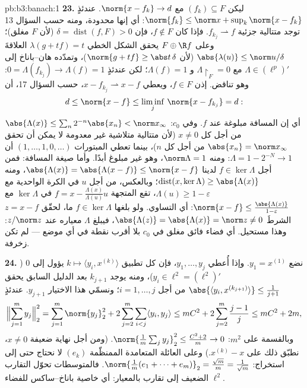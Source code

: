 \begin{solution}{pb:b3:banach:1}
\textbf{23.} ليكن $(f_k) \subseteq F$ مع $\norm{x - f_k}
\to d$. عندئذٍ $\norm{f_k} \leq \norm x + \sup_k\norm{x -
f_k}$: أي إنها
محدودة، ومنه حسب السؤال 13 توجد متتالية جزئية $f_{k_j}
\rightharpoonup f$. فإذا
كان $f \notin F$، فإن $\delta =
\operatorname{dist}(f, F) > 0$ (لأن $F$ مغلق)؛ وعلى $F \oplus \R
f$
يحقق الشكل الخطي $\lambda(g + tf) = t$ العلاقةَ $\abs{\lambda(u)} \leq \norm u/\delta$ (لأن $\norm{g +
tf} \geq \abs t\,\delta$)،
وتمدّده هان--باناخ إلى $\Lambda \in (\ell^p)'$ مع $\Lambda\restriction_F = 0$ و $\Lambda(f) = 1$؛
لكن عندئذٍ $0 = \Lambda(f_{k_j}) \to
\Lambda(f) = 1$: وهو تناقض. إذن $f \in F$، ويعطي $x -
f_{k_j} \rightharpoonup x - f$،
حسب السؤال 17، أن
\[
d \leq \norm{x - f} \leq \liminf_j\,\norm{x - f_{k_j}} = d :
\]
أي إن المسافة مبلوغة عند $f$. وفي $c_0$: $\abs{\Lambda(x)}
\leq \sum_n2^{-n}\abs{x_n} < \norm x_\infty$ من أجل كل
$x
\neq 0$ (لأن متتالية متلاشية غير معدومة لا يمكن أن تحقق $\abs{x_n} =
\norm x_\infty$
من أجل كل $n$)، بينما تعطي المبتورات $(1,
\dots, 1, 0, \dots)$ أن $\Lambda = 1 - 2^{-N} \to 1$: ومنه
$\norm\Lambda = 1$، وهو غير مبلوغ أبدًا. وأما صيغة المسافة: فمن أجل
$f
\in \ker\Lambda$ لدينا $\abs{\Lambda(x)} = \abs{\Lambda(x - f)}
\leq \norm{x - f}$، ومنه $\operatorname{dist}(x, \ker\Lambda)
\geq \abs{\Lambda(x)}$؛ وبالعكس، من أجل $u$ في
الكرة الواحدية مع $\Lambda(u) \geq 1 - \varepsilon$، تقع المتجهة $f = x -
\frac{\Lambda(x)}{\Lambda(u)}u$ في
$\ker\Lambda$ مع $\norm{x - f} \leq \frac{\abs{\Lambda(x)}}{1 - \varepsilon}$: أي التساوي. ولو بلغها $f \in \ker\Lambda$ ما،
لحقّق $z = x -
f$ الشرطَ $\abs{\Lambda(z)} = \abs{\Lambda(x)} =
\norm z \neq 0$، فيبلغ $\Lambda$ معياره عند
$z/\norm z$: وهذا مستحيل. أي فضاء فائق مغلق في $c_0$ بلا أقرب
نقطة في أي موضع ---  لم تكن زخرفة.

\textbf{24.} نضع $y_1 = x^{(1)}$. وإذا أُعطي $y_1, \dots, y_j$، فإن كل
تطبيق $k \mapsto \langle y_i, x^{(k)}\rangle$ يؤول إلى $0$ ($y_i \in \ell^2 = (\ell^2)'$)، ومنه يوجد $k_{j+1}$ بعد
الدليل السابق يحقق $\abs{\langle y_i,
x^{(k_{j+1})}\rangle} \leq \frac1{j+1}$ من أجل $i = 1, \dots,
j$؛ ونسمّي هذا الاختيار
$y_{j+1}$. عندئذٍ
\[
\Bigl\lVert\sum_{j=1}^my_j\Bigr\rVert_2^2
= \sum_{j=1}^m\norm{y_j}_2^2
+ 2\sum_{j=2}^m\sum_{i<j}\langle y_i, y_j\rangle
\leq mC^2 + 2\sum_{j=2}^m\frac{j-1}j
\leq mC^2 + 2m,
\]
وبالقسمة على $m^2$: $\norm{\frac1m\sum_jy_j}_2^2 \leq
\frac{C^2 + 2}m \to 0$. (ومن أجل نهاية ضعيفة $x \neq 0$،
نطبّق ذلك على $x^{(k)} - x$.) وعلى العائلة المتعامدة الممنظّمة
$(e_k)$ لا نحتاج حتى إلى استخراج: $\norm{\frac1m(e_1 + \dots +
e_m)}_2 = \frac{\sqrt m}m = \frac1{\sqrt m}$. فالمتوسطات تحوّل
التقارب الضعيف إلى تقارب بالمعيار: أي خاصية باناخ--ساكس للفضاء
$\ell^2$.


\end{solution}

